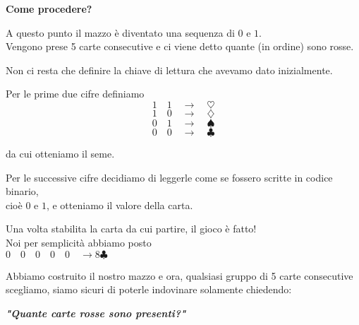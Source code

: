\documentclass[8pt]{beamer}
\theoremstyle{plain}
\theoremstyle{definition}
\begin{document}
\begin{frame}
\begin{center}
\textbf{Come procedere?}

\bigskip
\bigskip

A questo punto il mazzo è diventato una sequenza di $0$ e $1$. \\Vengono prese 5 carte consecutive e ci viene detto quante (in ordine) sono rosse.

\bigskip

Non ci resta che definire la chiave di lettura che avevamo dato inizialmente. 

\smallskip

Per le prime due cifre definiamo
$$ 1\quad 1 \quad\rightarrow\quad \heartsuit$$ $$ 1\quad 0 \quad\rightarrow\quad \diamondsuit$$ $$ 0\quad 1 \quad\rightarrow\quad \spadesuit$$ $$ 0\quad 0 \quad\rightarrow\quad \clubsuit$$

\smallskip

da cui otteniamo il seme.
\end{center}
\end{frame}

\begin{frame}
\begin{center}
Per le successive cifre decidiamo di leggerle come se fossero scritte in codice binario, \\cioè $0$ e $1$, e otteniamo il valore della carta.

\bigskip
\bigskip

Una volta stabilita la carta da cui partire, il gioco è fatto! \\Noi per semplicità abbiamo posto \\$0\quad 0\quad 0\quad 0\quad0 \quad \rightarrow 8\clubsuit$
\end{center}
\end{frame}


\begin{frame}
\begin{center}
Abbiamo costruito il nostro mazzo e ora, qualsiasi gruppo di 5 carte consecutive scegliamo, siamo sicuri di poterle indovinare solamente chiedendo:

\bigskip

\textbf{\textit{"Quante carte rosse sono presenti?"}}
\end{center}
\end{frame}
\end{document}
